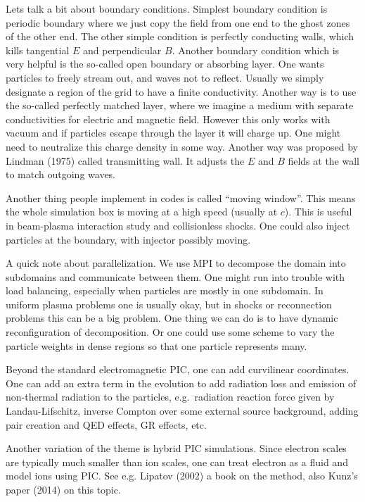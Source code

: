 \documentclass[letterpaper, 11pt]{article}
\numberwithin{equation}{section}
\numberwithin{figure}{section}
\begin{document}
Lets talk a bit about boundary conditions. Simplest boundary condition is
periodic boundary where we just copy the field from one end to the ghost
zones of the other end. The other simple condition is perfectly conducting
walls, which kills tangential $E$ and perpendicular $B$. Another boundary
condition which is very helpful is the so-called open boundary or absorbing
layer. One wants particles to freely stream out, and waves not to reflect.
Usually we simply designate a region of the grid to have a finite conductivity.
Another way is to use the so-called perfectly matched layer, where we imagine a
medium with separate conductivities for electric and magnetic field. However
this only works with vacuum and if particles escape through the layer it will
charge up. One might need to neutralize this charge density in some way. Another
way was proposed by Lindman (1975) called transmitting wall. It adjusts the
$E$ and $B$ fields at the wall to match outgoing waves.

Another thing people implement in codes is called ``moving window''. This means
the whole simulation box is moving at a high speed (usually at $c$). This is
useful in beam-plasma interaction study and collisionless shocks. One could also
inject particles at the boundary, with injector possibly moving.

A quick note about parallelization. We use MPI to decompose the domain into
subdomains and communicate between them. One might run into trouble with load
balancing, especially when particles are mostly in one subdomain. In uniform
plasma problems one is usually okay, but in shocks or reconnection problems this
can be a big problem. One thing we can do is to have dynamic reconfiguration of
decomposition. Or one could use some scheme to vary the particle weights in
dense regions so that one particle represents many.

Beyond the standard electromagnetic PIC, one can add curvilinear coordinates.
One can add an extra term in the evolution to add radiation loss and emission of
non-thermal radiation to the particles, e.g.\ radiation reaction force given by
Landau-Lifschitz, inverse Compton over some external source background, adding
pair creation and QED effects, GR effects, etc.

Another variation of the theme is hybrid PIC simulations. Since electron scales
are typically much smaller than ion scales, one can treat electron as a fluid
and model ions using PIC. See e.g. Lipatov (2002) a book on the method, also
Kunz's paper (2014) on this topic.
\end{document}
